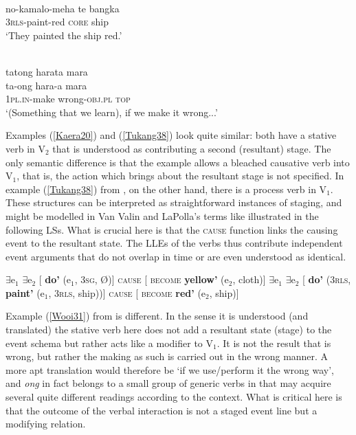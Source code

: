 \ea \label{Tukang38}
\\
\gll no-kamalo-meha te bangka \\
3\textsc{rls}-paint-red \textsc{core} ship \\
\glft `They painted the ship red.' \\ 
\z

\ea \label{Wooi31}
\\
\glll tatong harata mara \\
ta-ong hara-a mara \\
1\textsc{pl}.\textsc{in}-make wrong-\textsc{obj}.\textsc{pl} \textsc{top}\\
\glft `(Something that we learn), if we make it wrong...' \\ 
\z

Examples (\ref{Kaera20}) and (\ref{Tukang38}) look quite similar: both have a stative verb in V$_2$ that is understood as contributing a second (resultant) stage. The only semantic difference is that the  example allows a bleached causative verb into V$_1$, that is, the action which brings about the resultant stage is not specified. In example (\ref{Tukang38}) from , on the other hand, there is a process verb in V$_1$. These structures can be interpreted as straightforward instances of staging, and might be modelled in Van Valin and LaPolla's terms like illustrated in the following LSs. What is crucial here is that the \textsc{cause} function links the causing event to the resultant state. The LLEs of the verbs thus contribute independent event arguments that do not overlap in time or are even understood as identical.

\ea
\ea \label{Kaera20_LS} $\exists$e$_1$ $\exists$e$_2$ [ \textbf{do'} (e$_1$, 3\textsc{sg}, Ø)] \textsc{cause} [ \textsc{become} \textbf{yellow'} (e$_2$, cloth)]
\ex \label{Tukang38_LS} $\exists$e$_1$ $\exists$e$_2$ [ \textbf{do'} (3\textsc{rls}, \textbf{paint'} (e$_1$, 3\textsc{rls}, ship))] \textsc{cause} [ \textsc{become} \textbf{red'} (e$_2$, ship)]
\z
\z

Example (\ref{Wooi31}) from  is different. In the sense it is understood (and translated) the stative verb here does not add a resultant state (stage) to the event schema but rather acts like a modifier to V$_1$. It is not the result that is wrong, but rather the making as such is carried out in the wrong manner. A more apt translation would therefore be `if we use/perform it the wrong way', and \textit{ong} in fact belongs to a small group of generic verbs in  that may acquire several quite different readings according to the context. What is critical here is that the outcome of the verbal interaction is not a staged event line but a modifying relation. 

